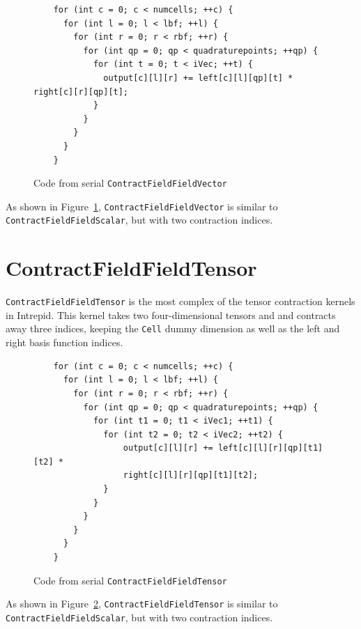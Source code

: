 \begin{figure}[ht]
    \begin{lstlisting}
    for (int c = 0; c < numcells; ++c) {
      for (int l = 0; l < lbf; ++l) {
        for (int r = 0; r < rbf; ++r) {
          for (int qp = 0; qp < quadraturepoints; ++qp) {
            for (int t = 0; t < iVec; ++t) {
              output[c][l][r] += left[c][l][qp][t] * right[c][r][qp][t];
            }
          }
        }
      }
    }
    \end{lstlisting}
\caption{Code from serial \texttt{ContractFieldFieldVector}
\label{lst:ContractFieldFieldVectorSerial}} 
\end{figure}

As shown in Figure~\ref{lst:ContractFieldFieldVectorSerial},
\texttt{ContractFieldFieldVector} is similar to
\texttt{ContractFieldFieldScalar}, but with two contraction indices.

\section{ContractFieldFieldTensor}
\texttt{ContractFieldFieldTensor} is the most complex of the tensor contraction
kernels in Intrepid. This kernel takes two four-dimensional tensors and
and contracts away three indices, keeping the \texttt{Cell} dummy dimension as
well as the left and right basis function indices.

\begin{figure}[ht]
    \begin{lstlisting}
    for (int c = 0; c < numcells; ++c) {
      for (int l = 0; l < lbf; ++l) {
        for (int r = 0; r < rbf; ++r) {
          for (int qp = 0; qp < quadraturepoints; ++qp) {
            for (int t1 = 0; t1 < iVec1; ++t1) {
              for (int t2 = 0; t2 < iVec2; ++t2) {
                  output[c][l][r] += left[c][l][r][qp][t1][t2] *
                  right[c][l][r][qp][t1][t2];
              }
            }
          }
        }
      }
    }
    \end{lstlisting}
\caption{Code from serial \texttt{ContractFieldFieldTensor}
\label{lst:ContractFieldFieldTensorSerial}} 
\end{figure}

As shown in Figure~\ref{lst:ContractFieldFieldTensorSerial},
\texttt{ContractFieldFieldTensor} is similar to
\texttt{ContractFieldFieldScalar}, but with two contraction indices.

